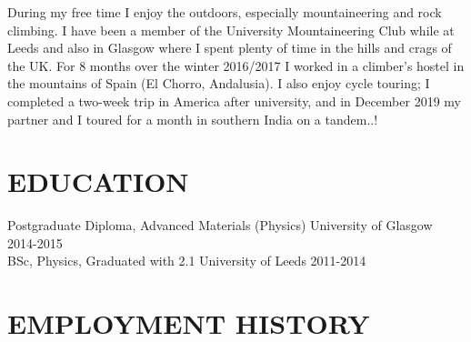 \documentclass[overlap, line, 10pt]{res} %
\begin{document}
\begin{resume}
During my free time I enjoy the outdoors, especially mountaineering and rock climbing. I have been a member of the University Mountaineering Club while at Leeds and also in Glasgow where I spent plenty of time in the hills and crags of the UK.
For 8 months over the winter 2016/2017 I worked in a climber's hostel in the mountains of Spain (El Chorro, Andalusia). I also enjoy cycle touring; I completed a two-week trip in America after university, and in December 2019 my partner and I toured for a month in southern India on a tandem..!

\section{EDUCATION}

Postgraduate Diploma, Advanced Materials (Physics) University of Glasgow 2014-2015\\
BSc, Physics, Graduated with 2.1 University of Leeds 2011-2014

\section{EMPLOYMENT HISTORY}


\end{resume}
\end{document}
